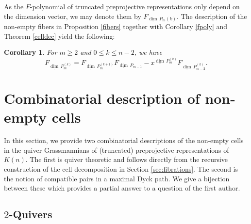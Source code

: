 \documentclass{amsart}
\newtheorem{corollary}[theorem]{Corollary}
\numberwithin{equation}{section}
\newcommand\udim{{\underline{\dim}\, }}
\begin{document}
As the $F$-polynomial of truncated preprojective representations only depend on the dimension vector, we may denote them by $F_{\udim P_m{(k)}}$. The description of the non-empty fibers in Proposition \ref{fibers} together with Corollary \ref{fpoly} and Theorem \ref{celldec} yield the following:
\begin{corollary}
For $m\geq 2$ and $0\leq k\leq n-2$, we have 
$$F_{\udim P_m^{(k)}}=F_{\udim P_m^{(k+1)}}F_{\udim P_{m-1}}-x^{\udim P_{m}^{(k)}}F_{\udim P_{m-2}^{(k)}}.$$
\end{corollary}


\section{Combinatorial description of non-empty cells}
\noindent In this section, we provide two combinatorial descriptions of the non-empty cells in the quiver Grassmannians of (truncated) preprojective representations of $K(n)$.
The first is quiver theoretic and follows directly from the recursive construction of the cell decomposition in Section \ref{sec:fibrations}.
The second is the notion of compatible pairs in a maximal Dyck path.
We give a bijection between these which provides a partial answer to a question of the first author.

\subsection{$2$-Quivers}
\end{document}
